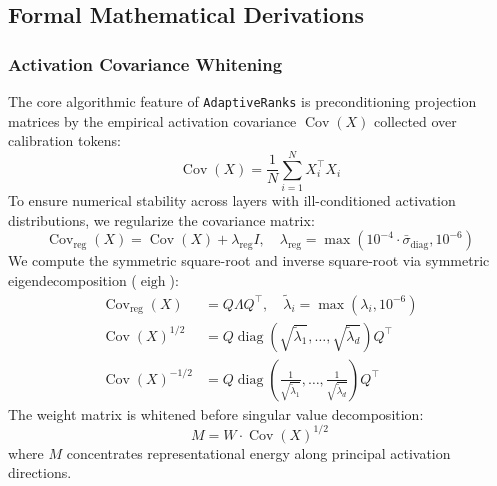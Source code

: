 \subsection{Formal Mathematical Derivations}

\subsubsection{Activation Covariance Whitening}
\label{sec:covariance_whitening}
The core algorithmic feature of \texttt{AdaptiveRanks} is preconditioning projection matrices by the empirical activation covariance $\operatorname{Cov}(X)$ collected over calibration tokens:
\begin{equation}
\operatorname{Cov}(X) = \frac{1}{N} \sum_{i=1}^N X_i^\top X_i
\end{equation}
To ensure numerical stability across layers with ill-conditioned activation distributions, we regularize the covariance matrix:
\begin{equation}
\operatorname{Cov}_{\text{reg}}(X) = \operatorname{Cov}(X) + \lambda_{\text{reg}} I, \quad \lambda_{\text{reg}} = \max(10^{-4} \cdot \bar{\sigma}_{\text{diag}}, 10^{-6})
\end{equation}
We compute the symmetric square-root and inverse square-root via symmetric eigendecomposition ($\operatorname{eigh}$):
\begin{align}
\operatorname{Cov}_{\text{reg}}(X) &= Q \Lambda Q^\top, \quad \tilde{\lambda}_i = \max(\lambda_i, 10^{-6}) \\
\operatorname{Cov}(X)^{1/2} &= Q \operatorname{diag}\left(\sqrt{\tilde{\lambda}_1}, \dots, \sqrt{\tilde{\lambda}_d}\right) Q^\top \\
\operatorname{Cov}(X)^{-1/2} &= Q \operatorname{diag}\left(\frac{1}{\sqrt{\tilde{\lambda}_1}}, \dots, \frac{1}{\sqrt{\tilde{\lambda}_d}}\right) Q^\top
\end{align}
The weight matrix is whitened before singular value decomposition:
\begin{equation}
M = W \cdot \operatorname{Cov}(X)^{1/2}
\end{equation}
where $M$ concentrates representational energy along principal activation directions.

